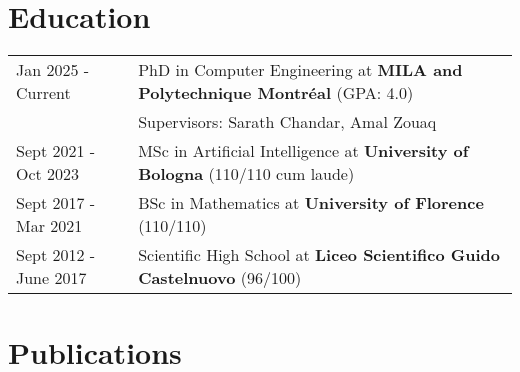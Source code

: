 \documentclass[a4paper,12pt]{article}
\begin{document}
\section{Education}
\begin{tabularx}{\linewidth}{@{}l X@{}} 	
Jan 2025 - Current & PhD in Computer Engineering at \textbf{MILA and Polytechnique Montréal} \hfill \normalsize (GPA: 4.0) \\
 & \normalsize Supervisors: Sarath Chandar, Amal Zouaq \\

Sept 2021 - Oct 2023 & MSc in Artificial Intelligence at \textbf{University of Bologna} \hfill \normalsize (110/110 cum laude) \\

Sept 2017 - Mar 2021 & BSc in Mathematics at \textbf{University of Florence} \hfill \normalsize (110/110) \\

Sept 2012 - June 2017 & Scientific High School at \textbf{Liceo Scientifico Guido Castelnuovo} \hfill \normalsize (96/100) \\
\end{tabularx}

\section{Publications}
\begin{refsection}
\nocite{*}
\printbibliography[heading=none]
\end{refsection}

\end{document}
